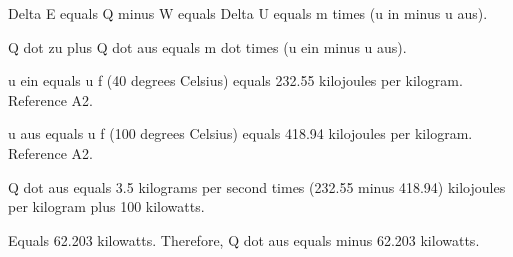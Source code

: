 Delta E equals Q minus W equals Delta U equals m times (u in minus u aus).

Q dot zu plus Q dot aus equals m dot times (u ein minus u aus).

u ein equals u f (40 degrees Celsius) equals 232.55 kilojoules per kilogram. Reference A2.

u aus equals u f (100 degrees Celsius) equals 418.94 kilojoules per kilogram. Reference A2.

Q dot aus equals 3.5 kilograms per second times (232.55 minus 418.94) kilojoules per kilogram plus 100 kilowatts.

Equals 62.203 kilowatts. Therefore, Q dot aus equals minus 62.203 kilowatts.